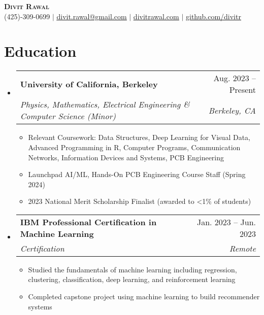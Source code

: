 \documentclass[letterpaper,11pt]{article}
\makeatletter
\newcommand{\resumeItem}[1]{
  \item\small{
    {#1 \vspace{-2pt}}
  }
}
\newcommand{\resumeSubheading}[4]{
  \vspace{-2pt}\item
    \begin{tabular*}{0.97\textwidth}[t]{l@{\extracolsep{\fill}}r}
      \textbf{#1} & #2 \\
      \textit{\small#3} & \textit{\small #4} \\
    \end{tabular*}\vspace{-7pt}
}
\newcommand{\resumeSubHeadingListStart}{\begin{itemize}[leftmargin=0.15in, label={}]}
\newcommand{\resumeSubHeadingListEnd}{\end{itemize}}
\newcommand{\resumeItemListStart}{\begin{itemize}}
\newcommand{\resumeItemListEnd}{\end{itemize}\vspace{-5pt}}
\makeatother
\begin{document}

\begin{center}
    \textbf{\Huge \scshape Divit Rawal} \\ \vspace{1pt}
    \small (425)-309-0699 $|$ \href{mailto:divit.rawal@gmail.com}{\underline{divit.rawal@gmail.com}} $|$ 
    \href{https://www.divitrawal.com}{\underline{divitrawal.com}} $|$
    \href{https://www.github.com/divitr/}{\underline{github.com/divitr}}
\end{center}

\section{Education}
  \resumeSubHeadingListStart
    \resumeSubheading
      {University of California, Berkeley}{Aug. 2023 -- Present}
      {Physics, Mathematics, Electrical Engineering \& Computer Science (Minor)}{Berkeley, CA}
      \resumeItemListStart
        \resumeItem{Relevant Coursework: Data Structures, Deep Learning for Visual Data, Advanced Programming in R, Computer Programs, Communication Networks,  Information Devices and Systems, PCB Engineering}
        \resumeItem{Launchpad  AI/ML, Hands-On PCB Engineering Course Staff (Spring 2024)}
        \resumeItem{2023 National Merit Scholarship Finalist (awarded to \textless 1\% of students)}
      \resumeItemListEnd
  \resumeSubHeadingListEnd

  \resumeSubHeadingListStart
    \resumeSubheading
      {IBM Professional Certification in Machine Learning}{Jan. 2023 -- Jun. 2023}
      {Certification}{Remote}
      \resumeItemListStart
        \resumeItem{Studied the fundamentals of machine learning including regression, clustering, classification, deep learning, and reinforcement learning}
        \resumeItem{Completed capstone project using machine learning to build recommender systems}
      \resumeItemListEnd
  \resumeSubHeadingListEnd
\end{document}
